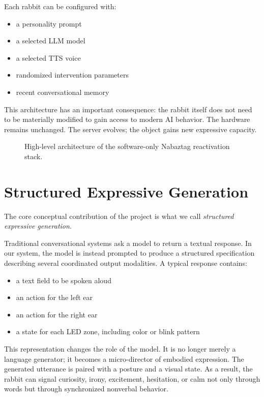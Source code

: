 \documentclass[11pt]{article}
\begin{document}
Each rabbit can be configured with:

\begin{itemize}[leftmargin=1.5em]
  \item a personality prompt
  \item a selected LLM model
  \item a selected TTS voice
  \item randomized intervention parameters
  \item recent conversational memory
\end{itemize}

This architecture has an important consequence: the rabbit itself does not need to be materially modified to gain access to modern AI behavior. The hardware remains unchanged. The server evolves; the object gains new expressive capacity.

\begin{figure}[t]
  \centering
  \caption{High-level architecture of the software-only Nabaztag reactivation stack.}
  \label{fig:architecture}
\end{figure}

\section{Structured Expressive Generation}

The core conceptual contribution of the project is what we call \emph{structured expressive generation}.

Traditional conversational systems ask a model to return a textual response. In our system, the model is instead prompted to produce a structured specification describing several coordinated output modalities. A typical response contains:

\begin{itemize}[leftmargin=1.5em]
  \item a text field to be spoken aloud
  \item an action for the left ear
  \item an action for the right ear
  \item a state for each LED zone, including color or blink pattern
\end{itemize}

This representation changes the role of the model. It is no longer merely a language generator; it becomes a micro-director of embodied expression. The generated utterance is paired with a posture and a visual state. As a result, the rabbit can signal curiosity, irony, excitement, hesitation, or calm not only through words but through synchronized nonverbal behavior.
\end{document}
